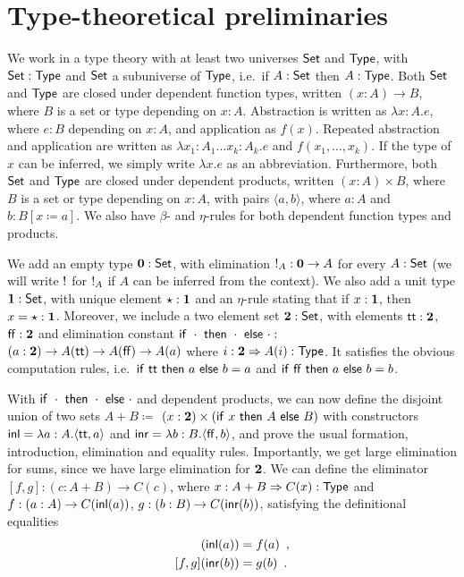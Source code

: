 \documentclass{schwicht}
\begin{document}
\section{Type-theoretical preliminaries}
\label{sec:preliminaries}

We work in a type theory with at least two universes $\mathsf{Set}$ and
$\mathsf{Type}$, with $\mathsf{Set} : \mathsf{Type}$ and $\mathsf{Set}$ a subuniverse of $\mathsf{Type}$,
i.e.\ if $A : \mathsf{Set}$ then $A : \mathsf{Type}$. Both $\mathsf{Set}$ and $\mathsf{Type}$ are
closed under dependent function types, written $(x : A) \to B$, where
$B$ is a set or type depending on $x: A$. Abstraction is written as
$\lambda x : A . e$, where $e : B$ depending on $x : A$, and
application as $f(x)$. Repeated abstraction and application are
written as $\lambda x_1 : A_1 \ldots x_k : A_k . e$ and $f(x_1,
\ldots, x_k)$. If the type of $x$ can be inferred, we simply write
$\lambda x.e$ as an abbreviation.  Furthermore, both $\mathsf{Set}$ and
$\mathsf{Type}$ are closed under dependent products, written $(x : A) \times
B$, where $B$ is a set or type depending on $x: A$, with pairs
$\langle a , b \rangle$, where $a : A$ and $b : B[x \coloneqq a]$.
We also have $\beta$- and $\eta$-rules for both dependent function types
and products.

We add an empty type $\mathbf{0} : \mathsf{Set}$, with elimination ${!_{A} : \mathbf{0}
  \to A}$ for every $A : \mathsf{Set}$ (we will write $!$ for $!_{A}$ if $A$ can
be inferred from the context). We also add a unit type $\mathbf{1} : \mathsf{Set}$,
with unique element $\star : \mathbf{1}$ and an $\eta$-rule stating that
if $x : \mathbf{1}$, then $x = \star : \mathbf{1}$. Moreover, we include a two
element set $\mathbf{2} : \mathsf{Set}$, with elements $\mathsf{tt} : \mathbf{2}$, $\mathsf{ff} :
\mathbf{2}$ and elimination constant $\mathsf{if}~\cdot~\mathsf{then}~\cdot~\mathsf{else}~\cdot :$
$(a : \mathbf{2}) \to A(\mathsf{tt}) \to A(\mathsf{ff}) \to A(a)$ where $i : \mathbf{2}
\Rightarrow A(i) : \mathsf{Type}$. It satisfies the obvious computation rules,
i.e.\ $\mathsf{if}~\mathsf{tt}~\mathsf{then}~a~\mathsf{else}~b = a$ and $\mathsf{if}~\mathsf{ff}~\mathsf{then}~a~\mathsf{else}~b
= b$.

With $\mathsf{if}~\cdot~\mathsf{then}~\cdot~\mathsf{else}~\cdot$ and dependent products, we can now
define the disjoint union of two sets $A + B \coloneqq$ ${(x : \mathbf{2})}
\times (\mathsf{if}~x~\mathsf{then}~A~\mathsf{else}~B)$ with constructors $\mathsf{inl} = \lambda {a :
  A} . \langle \mathsf{tt} , a \rangle$ and $\mathsf{inr} = \lambda {b : B}
. \langle \mathsf{ff} , b \rangle$, and prove the usual formation,
introduction, elimination and equality rules. Importantly, we get
large elimination for sums, since we have large elimination for
$\mathbf{2}$. We can define the eliminator ${[f, g] : {(c : A + B)} \to C(c)}$, where
$x : A + B \Rightarrow C(x) : \mathsf{Type}$ and $f : (a : A) \to C(\mathsf{inl}(a))$,
$g : (b : B) \to C(\mathsf{inr}(b))$, satisfying the definitional equalities
\begin{align*}
[f, g](\inl(a)) &= f(a) \enspace , \\
[f, g](\inr(b)) &= g(b) \enspace .
\end{align*}
\end{document}
